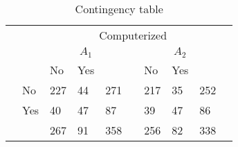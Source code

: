 \begin{table}
\begin{small}
\begin{threeparttable}
\caption{{\normalsize Contingency table}}
\label{table:contingency_classifications}
\begin{tabular}{ll|ll|ll|ll|ll}
& & \multicolumn{7}{c}{Computerized} \tabularnewline[0.1cm]
& & \multicolumn{3}{c}{$A_1$} & & \multicolumn{3}{c}{$A_2$} \tabularnewline[0.1cm]
& & No & Yes & & & No & Yes &  \tabularnewline
\cline{2-5} \cline{7-9}
\parbox[t]{2mm}{} & No & 227 & 44 & 271 & & 217 & 35 & 252 \tabularnewline
& Yes & 40 & 47 & 87 & & 39 & 47 & 86 \tabularnewline
{} 
&  & 267 & 91 & 358 & & 256 & 82 & 338 \tabularnewline
\end{tabular}
\end{threeparttable}
\end{small}
\end{table}
